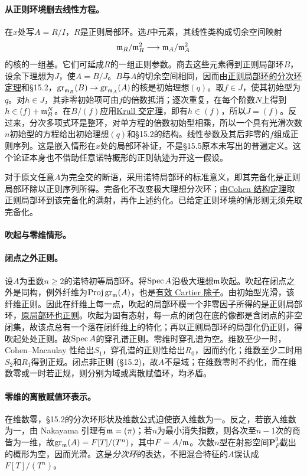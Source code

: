 \paragraph{从正则环境删去线性方程。}
在$x$处写$A=R/I$，$R$是正则局部环。选$I$中元素，其线性类构成切余空间映射
\[
\mathfrak m_R/\mathfrak m_R^2\longrightarrow\mathfrak m_A/\mathfrak m_A^2
\]
的核的一组基。它们可延成$R$的一组正则参数。商去这些元素得到正则局部环$B$，设余下理想为$J$，使$A=B/J$。$B$与$A$的切余空间相同，因而由\href{https://stacks.math.columbia.edu/tag/00NO}{正则局部环的分次环定理}和§15.2，$\operatorname{gr}_{\mathfrak m_B}(B)\to\operatorname{gr}_{\mathfrak m_A}(A)$的核是初始理想$(q)$。取$f\in J$，使其初始型为$q$。对$h\in J$，其非零初始项可由$f$的倍数抵消；逐次重复，在每个阶数$N$上得到$h\in(f)+\mathfrak m_B^N$。在$B/(f)$应用\href{https://stacks.math.columbia.edu/tag/00IP}{Krull 交定理}，即有$h\in(f)$，所以$J=(f)$。反过来，分次多项式环是整环，对单方程的倍数初始型相乘，所以一个具有光滑次数$n$初始型的方程给出初始理想$(q)$和§15.2的结构。线性参数及其后非零的$f$组成正则序列。这是嵌入情形在$x$处的局部环补证，不是§15.5原本未写出的普遍定义。这个论证本身也不借助任意诺特概形的正则轨迹为开这一假设。

对于原文任意$A$为完全交的断语，采用诺特局部环的标准意义，即其完备化是正则局部环除以正则序列所得。完备化不改变极大理想分次环；由\href{https://stacks.math.columbia.edu/tag/032A}{Cohen 结构定理}取正则局部环到该完备化的满射，再作上述约化。已给定正则环境的情形则无须先取完备化。
\paragraph{吹起与零维情形。}
\paragraph{闭点之外正则。}
设$A$为重数$n\ge2$的诺特初等局部环。将$\operatorname{Spec} A$沿极大理想$\mathfrak m$吹起。吹起在闭点之外是同构，例外纤维为$\operatorname{Proj}\operatorname{gr}_\mathfrak m(A)$，也是\href{https://stacks.math.columbia.edu/tag/01OF}{有效 Cartier 除子}。由初始型光滑，该纤维正则。因此在纤维上每一点，吹起的局部环模一个非零因子所得的是正则局部环，\href{https://stacks.math.columbia.edu/tag/00NU}{原局部环也正则}。吹起为固有态射，每一点的闭包在底的像都是含闭点的非空闭集，故该点总有一个落在闭纤维上的特化；再以正则局部环的局部化仍正则，得吹起处处正则。故$\operatorname{Spec} A$的穿孔谱正则。零维时穿孔谱为空。维数至少一时，Cohen--Macaulay 性给出$S_1$，穿孔谱的正则性给出$R_0$，因而约化；维数至少二时用$S_2$和$R_1$得到正规。闭点非正则 (§15.2)，故$A$不是域；在维数零时不约化，而在维数零或一时若正规，则分别为域或离散赋值环，均矛盾。

\paragraph{零维的离散赋值环表示。}
在维数零，§15.2的分次环形状及维数公式迫使嵌入维数为一。反之，若嵌入维数为一，由 Nakayama 引理有$\mathfrak m=(\pi)$；若$n$为最小消失指数，则各次至$n-1$次的商皆为一维，故$\operatorname{gr}_\mathfrak m(A)=F[T]/(T^n)$，其中$F=A/\mathfrak m$。次数$n$型在射影空间$\mathbf P^0_F$截出的概形为空，因而光滑。这是\emph{分次环}的表达，不把混合特征的$A$误认成$F[T]/(T^n)$。

